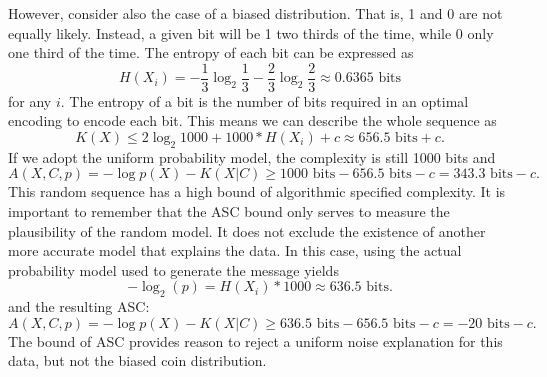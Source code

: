 However, consider also the case of a biased distribution.
That is, 1 and 0 are not equally likely.
Instead, a given bit will be 1 two thirds of the time, while 0 only one third of the time.
The entropy of each bit can be expressed as
\begin{equation}
    H(X_i) = - \frac{1}{3} \log_2 \frac{1}{3} - \frac{2}{3} \log_2 \frac{2}{3} \approx 0.6365 \mbox{ bits}
\end{equation} for any $i$.
The entropy of a bit is the number of bits required in an optimal encoding to encode each bit.
This means we can describe the whole sequence as
\begin{equation}
    K(X) \leq 2 \log_2 1000 + 1000*H(X_i) + c \approx 656.5 \mbox{ bits} +c \mbox{.}
\end{equation}
If we adopt the uniform probability model, the complexity is still 1000 bits and
\begin{equation}
    A(X,C,p) = - \log p(X) - K(X|C) \geq 1000 \mbox{ bits} - 656.5 \mbox{ bits} - c = 343.3 \mbox{ bits} -c \mbox{.}
\end{equation}
This random sequence has a high bound of algorithmic specified complexity.
It is important to remember that the ASC bound only serves to measure the plausibility of the random model.
It does not exclude the existence of another more accurate model that explains the data.
In this case, using the actual probability model used to generate the message yields
\begin{equation}
    -\log_2(p) = H(X_i) * 1000 \approx 636.5 \mbox{ bits.}
\end{equation}
and the resulting ASC:
\begin{equation}
    A(X,C,p) = - \log p(X) - K(X|C) \geq 636.5 \mbox{ bits} - 656.5 \mbox{ bits} - c = -20 \mbox{ bits} -c \mbox{.}
\end{equation}
The bound of ASC provides reason to reject a uniform noise explanation for this data, but not the biased coin distribution.

